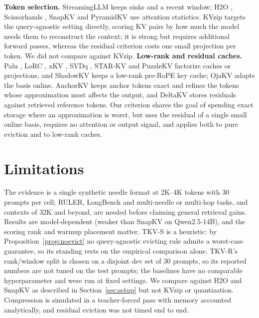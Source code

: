 \documentclass{article}
\begin{document}
\textbf{Token selection.} StreamingLLM \citep{streamingllm2023} keeps sinks and
a recent window; H2O \citep{h2o2023}, Scissorhands \citep{scissorhands2023},
SnapKV \citep{snapkv2024} and PyramidKV \citep{pyramidkv2024} use attention
statistics. KVzip \citep{kvzip2025} targets the query-agnostic setting
directly, scoring KV pairs by how much the model needs them to reconstruct the
context; it is strong but requires additional forward passes, whereas the
residual criterion costs one small projection per token. We did not compare
against KVzip. \textbf{Low-rank and residual caches.} Palu \citep{palu2024},
LoRC \citep{lorc2024}, xKV \citep{xkv2025}, SVDq \citep{svdq2025}, STAR-KV
\citep{starkv2026} and PuzzleKV \citep{puzzlekv2026} factorize caches or
projections, and ShadowKV \citep{shadowkv2024} keeps a low-rank pre-RoPE key
cache; OjaKV \citep{ojakov2025} adapts the basis online. AnchorKV
\citep{anchorkv2026} keeps anchor tokens exact and refines the tokens whose
approximation most affects the output, and DeltaKV \citep{deltakv2026} stores
residuals against retrieved reference tokens. Our criterion shares the goal of
spending exact storage where an approximation is worst, but uses the residual
of a single small online basis, requires no attention or output signal, and
applies both to pure eviction and to low-rank caches.

\section{Limitations}
\label{sec:limitations}

The evidence is a single synthetic needle format at 2K--4K tokens with 30
prompts per cell; RULER, LongBench and multi-needle or multi-hop tasks, and
contexts of 32K and beyond, are needed before claiming general retrieval
gains. Results are model-dependent (weaker than SnapKV on Qwen2.5-14B), and
the scoring rank and warmup placement matter. TKV-S is a heuristic: by
Proposition~\ref{prop:noevict} no query-agnostic evicting rule admits a
worst-case guarantee, so its standing rests on the empirical comparison alone.
TKV-R's rank/window split is chosen on a disjoint dev set of 30 prompts, so its
reported numbers are not tuned on the test prompts; the baselines have no
comparable hyperparameter and were run at fixed settings. We compare against H2O and
SnapKV as described in Section~\ref{sec:setup} but not KVzip or quantization.
Compression is simulated in a teacher-forced pass with memory accounted
analytically, and residual eviction was not timed end to end.
\end{document}
